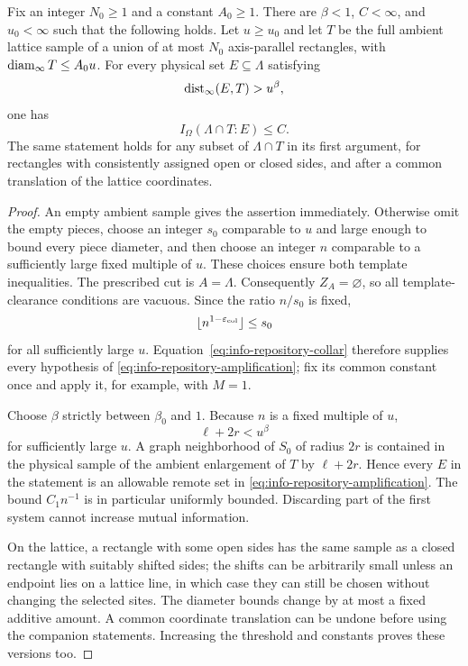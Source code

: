 \begin{proposition}
\label{prop:coarse}
Fix an integer $N_0\ge1$ and a constant $A_0\ge1$.  There are
$\beta<1$, $C<\infty$, and $u_0<\infty$ such that the following holds.
Let $u\ge u_0$ and let $T$ be the full ambient lattice sample of a union
of at most $N_0$ axis-parallel rectangles, with
$\operatorname{diam}_\infty T\le A_0u$.  For every physical set $E\subseteq\Lambda$
satisfying
\[
 \operatorname{dist}_\infty(E,T)>u^\beta,
\]
one has
\[
 I_\Omega(\Lambda\cap T:E)\le C.
\]
The same statement holds for any subset of $\Lambda\cap T$ in its first
argument, for rectangles with consistently assigned open or closed
sides, and after a common translation of the lattice coordinates.
\end{proposition}

\begin{proof}
An empty ambient sample gives the assertion immediately.  Otherwise
omit the empty pieces, choose an integer $s_0$ comparable to $u$ and
large enough to bound every piece diameter, and then choose an integer
$n$ comparable to a sufficiently large fixed multiple of $u$.  These
choices ensure both template inequalities.  The prescribed cut is
$A=\Lambda$.  Consequently $Z_A=\varnothing$, so all template-clearance
conditions are vacuous.  Since the ratio $n/s_0$ is fixed,
\[
 \lfloor n^{1-\varepsilon_{\rm col}}\rfloor\le s_0
\]
for all sufficiently large $u$.  Equation~\eqref{eq:info-repository-collar}
therefore supplies every hypothesis of
\eqref{eq:info-repository-amplification}; fix its common constant once
and apply it, for example, with $M=1$.

Choose $\beta$ strictly between $\beta_0$ and $1$.  Because $n$ is a
fixed multiple of $u$,
\[
 \ell+2r<u^\beta
\]
for sufficiently large $u$.  A graph neighborhood of $S_0$ of radius
$2r$ is contained in the physical sample of the ambient enlargement of
$T$ by $\ell+2r$.  Hence every $E$ in the statement is an allowable
remote set in \eqref{eq:info-repository-amplification}.  The bound
$C_1n^{-1}$ is in particular uniformly bounded.  Discarding part of the
first system cannot increase mutual information.

On the lattice, a rectangle with some open sides has the same sample
as a closed rectangle with suitably shifted sides; the shifts can be
arbitrarily small unless an endpoint lies on a lattice line, in which
case they can still be chosen without changing the selected sites.
The diameter bounds change by at most a fixed additive amount.  A
common coordinate translation can be undone before using the companion
statements.  Increasing the threshold and constants proves these
versions too.
\end{proof}

